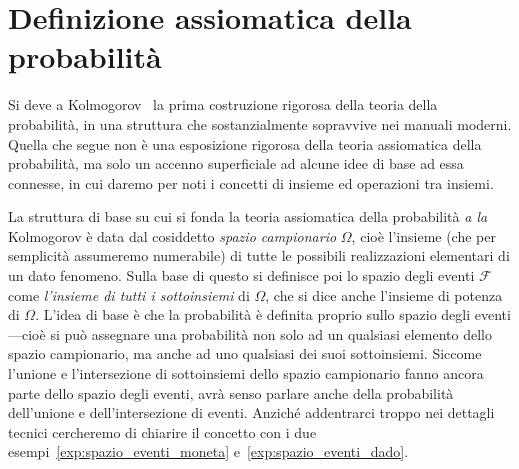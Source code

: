 \section{Definizione assiomatica della probabilità}%
\label{sec:definizione_assiomtica_prob}

Si deve a Kolmogorov~\cite{kolmogorov} la prima costruzione rigorosa della
teoria della probabilità, in una struttura che sostanzialmente sopravvive
nei manuali moderni. Quella che segue non è una esposizione rigorosa della
teoria assiomatica della probabilità, ma solo un accenno superficiale ad
alcune idee di base ad essa connesse, in cui daremo per noti i concetti di
insieme ed operazioni tra insiemi.

La struttura di base su cui si fonda la teoria assiomatica della probabilità
\emph{a la} Kolmogorov è data dal cosiddetto \emph{spazio campionario}
$\Omega$, cioè l'insieme (che per semplicità assumeremo numerabile) di
tutte le possibili realizzazioni elementari di un dato fenomeno. Sulla base di
questo si definisce poi lo spazio degli eventi $\mathcal F$ come
\emph{l'insieme di tutti i sottoinsiemi} di $\Omega$, che si dice anche
l'insieme di potenza di $\Omega$. L'idea di base è che la probabilità è
definita proprio sullo spazio degli eventi---cioè si può assegnare una
probabilità non solo ad un qualsiasi elemento dello spazio campionario, ma
anche ad uno qualsiasi dei suoi sottoinsiemi. Siccome l'unione e l'intersezione
di sottoinsiemi dello spazio campionario fanno ancora parte dello spazio degli
eventi, avrà senso parlare anche della probabilità dell'unione e
dell'intersezione di eventi.
Anziché addentrarci troppo nei dettagli tecnici cercheremo di chiarire il
concetto con i due esempi~\ref{exp:spazio_eventi_moneta}
e~\ref{exp:spazio_eventi_dado}.

